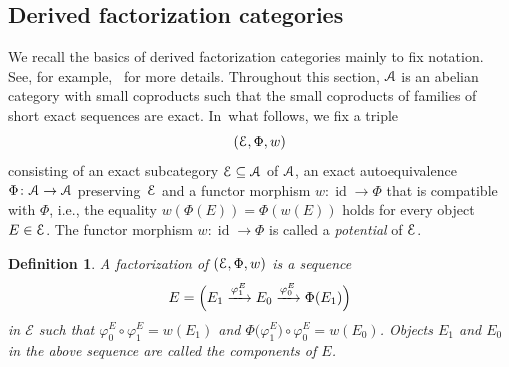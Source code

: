 \documentclass[11pt]{article}
\numberwithin{equation}{section}
\newtheorem{dfn}{Definition}[section]
\numberwithin{equation}{section}
\newcommand{\id}{\operatorname{id}}
\newcommand{\scrA}{\EuScript{A}}
\newcommand{\scrE}{\EuScript{E}}
\begin{document}
\subsection{Derived factorization categories}%
We recall the basics of derived factorization categories mainly to fix notation. See, for example,~\cite{bdfik,H1,posi} for more details.
Throughout this section, $\scrA$ is an abelian category with small coproducts such that the small coproducts of families of short exact sequences are exact. In~what follows, we fix a triple
\begin{equation}\label{triple}
(\scrE,\Phi,w)
\end{equation}
consisting of an exact subcategory $\scrE\subseteq\scrA$ of $\scrA$, an exact autoequivalence $\Phi\colon \scrA\to \scrA$ pre\-ser\-ving~$\scrE$ and a functor morphism $w\colon \id\to\Phi$ that is compatible with $\Phi$, i.e., the equality $w({\Phi(E)})=\Phi(w(E))$ holds for every object $E\in\scrE$. The functor morphism $w\colon \id\to\Phi$ is called a {\it potential} of $\scrE$.

\begin{dfn} A {\it factorization} of $(\scrE,\Phi,w)$ is a sequence
\begin{gather*}
E=\Bigl(E_1\xrightarrow{\varphi^E_1}E_0\xrightarrow{\varphi^E_0}\Phi(E_1)\Bigr)
\end{gather*}
in $\mathcal{E}$ such that $\varphi^E_0\circ\varphi^E_1=w(E_1)$ and $\Phi\big(\varphi^E_1\big)\circ\varphi^E_0=w(E_0)$. Objects $E_1$ and $E_0$ in the above sequence are called the {\it components} of $E$. \end{dfn}
\end{document}
